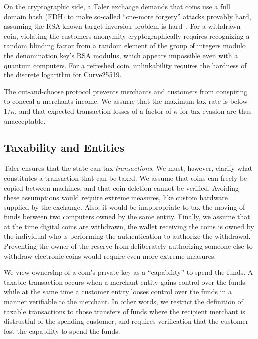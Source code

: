 \documentclass[sigconf, authordraft]{acmart}
\begin{document}
On the cryptographic side, a Taler exchange demands that coins use a
full domain hash (FDH) to make so-called ``one-more forgery'' attacks
provably hard, assuming the RSA known-target inversion problem is
hard~\cite[Theorem 12]{RSA-HDF-KTIvCTI}.  For a withdrawn coin,
violating the customers anonymity cryptographically requires recognizing
a random blinding factor from a random element of the group of
integers modulo the denomination key's RSA modulus, which appears
impossible even with a quantum computers.  For a refreshed coin,
unlinkability requires the hardness of the discrete logarithm for
Curve25519.

The cut-and-choose protocol prevents merchants and customers from
conspiring to conceal a merchants income.  We assume that the maximum
tax rate is below $1/\kappa$, and that expected transaction losses of
a factor of $\kappa$ for tax evasion are thus unacceptable.


\subsection{Taxability and Entities}

Taler ensures that the state can tax {\em transactions}.  We must,
however, clarify what constitutes a transaction that can be taxed.
We assume that coins can freely be
copied between machines, and that coin deletion cannot be verified.
Avoiding these assumptions would require extreme measures, like custom
hardware supplied by the exchange.  Also, it would be inappropriate to
tax the moving of funds between two computers owned by the same
entity.  Finally, we assume that at the time digital coins are
withdrawn, the wallet receiving the coins is owned by the individual
who is performing the authentication to authorize the withdrawal.
Preventing the owner of the reserve from deliberately authorizing
someone else to withdraw electronic coins would require even more
extreme measures.

We view ownership of a coin's private key as a ``capability'' to spend
the funds.  A taxable transaction occurs when a merchant entity gains
control over the funds while at the same time a customer entity looses
control over the funds in a manner verifiable to the merchant.  In
other words, we restrict the definition of taxable transactions to
those transfers of funds where the recipient merchant is distrustful
of the spending customer, and requires verification that the customer
lost the capability to spend the funds.
\end{document}
